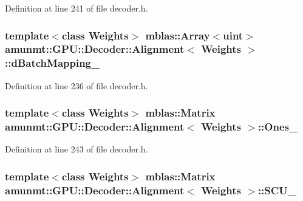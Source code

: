 Definition at line 241 of file decoder.\+h.

\subsubsection[{\texorpdfstring{d\+Batch\+Mapping\+\_\+}{dBatchMapping_}}]{\setlength{\rightskip}{0pt plus 5cm}template$<$class Weights$>$ {\bf mblas\+::\+Array}$<$uint$>$ {\bf amunmt\+::\+G\+P\+U\+::\+Decoder\+::\+Alignment}$<$ {\bf Weights} $>$\+::d\+Batch\+Mapping\+\_\+\hspace{0.3cm}{\ttfamily [private]}}\hypertarget{classamunmt_1_1GPU_1_1Decoder_1_1Alignment_ab90a6f08ed51961ec0e95125a3024ac8}{}\label{classamunmt_1_1GPU_1_1Decoder_1_1Alignment_ab90a6f08ed51961ec0e95125a3024ac8}


Definition at line 236 of file decoder.\+h.

\subsubsection[{\texorpdfstring{Ones\+\_\+}{Ones_}}]{\setlength{\rightskip}{0pt plus 5cm}template$<$class Weights$>$ {\bf mblas\+::\+Matrix} {\bf amunmt\+::\+G\+P\+U\+::\+Decoder\+::\+Alignment}$<$ {\bf Weights} $>$\+::Ones\+\_\+\hspace{0.3cm}{\ttfamily [private]}}\hypertarget{classamunmt_1_1GPU_1_1Decoder_1_1Alignment_a86103e1e592a30bfe7efc705ee3779ed}{}\label{classamunmt_1_1GPU_1_1Decoder_1_1Alignment_a86103e1e592a30bfe7efc705ee3779ed}


Definition at line 243 of file decoder.\+h.

\subsubsection[{\texorpdfstring{S\+C\+U\+\_\+}{SCU_}}]{\setlength{\rightskip}{0pt plus 5cm}template$<$class Weights$>$ {\bf mblas\+::\+Matrix} {\bf amunmt\+::\+G\+P\+U\+::\+Decoder\+::\+Alignment}$<$ {\bf Weights} $>$\+::S\+C\+U\+\_\+\hspace{0.3cm}{\ttfamily [private]}}\hypertarget{classamunmt_1_1GPU_1_1Decoder_1_1Alignment_ac209ca675c6170b4eb433d4ec323ed37}{}\label{classamunmt_1_1GPU_1_1Decoder_1_1Alignment_ac209ca675c6170b4eb433d4ec323ed37}


